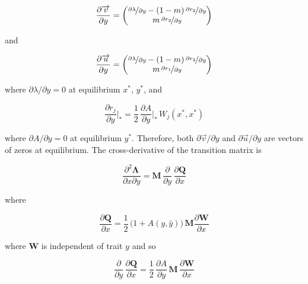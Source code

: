 \begin{equation}
    \frac{\partial \overrightarrow{v}}{\partial y} =
    \begin{pmatrix}
        \nicefrac{\partial \lambda}{\partial y} - (1-m)\,\nicefrac{\partial r_2}{\partial y}\\
        m \,\nicefrac{\partial r_2}{\partial y}
    \end{pmatrix}
\end{equation}

and

\begin{equation}
    \frac{\partial \overrightarrow{u}}{\partial y} =
    \begin{pmatrix}
        \nicefrac{\partial \lambda}{\partial y} - (1-m)\,\nicefrac{\partial r_2}{\partial y}\\
        m \,\nicefrac{\partial r_1}{\partial y}
    \end{pmatrix}
\end{equation}

where $\partial \lambda / \partial y = 0$ at equilibrium $x^*$, $y^*$, and

\begin{equation}
    \frac{\partial r_j}{\partial y}\bigg|_* = \frac{1}{2} \, \frac{\partial A}{\partial y}\bigg|_*\,W_j(x^*,x^*)
\end{equation}

where $\partial A / \partial y = 0$ at equilibrium $y^*$. Therefore, both $\partial \overrightarrow{v} / \partial y$ and $\partial \overrightarrow{u} / \partial y$ are vectors of zeros at equilibrium. The cross-derivative of the transition matrix is

\begin{equation}
    \frac{\partial^2 \pmb \Lambda}{\partial x \partial y} = \pmb M \, \frac{\partial}{\partial y}\,\frac{\partial \pmb Q}{\partial x}
\end{equation}

where 

\begin{equation}
    \frac{\partial \pmb Q}{\partial x} = \frac{1}{2}\,\big(1+A(y,\hat y)\big)\,\pmb M \frac{\partial \pmb W}{\partial x}
\end{equation}

where $\pmb W$ is independent of trait $y$ and so

\begin{equation}
    \frac{\partial}{\partial y}\,\frac{\partial \pmb Q}{\partial x} = \frac{1}{2}\,\frac{\partial A}{\partial y}\,\pmb M\,\frac{\partial \pmb W}{\partial x}
\end{equation}

